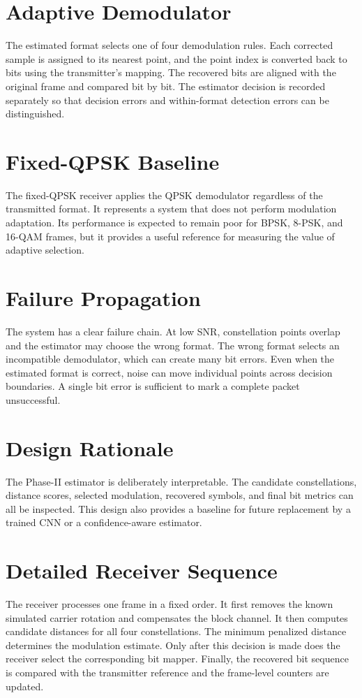 \documentclass[12pt,twoside,openright]{report}
\begin{document}
\section{Adaptive Demodulator}
The estimated format selects one of four demodulation rules. Each corrected
sample is assigned to its nearest point, and the point index is converted
back to bits using the transmitter's mapping. The recovered bits are aligned
with the original frame and compared bit by bit. The estimator decision is
recorded separately so that decision errors and within-format detection
errors can be distinguished.

\section{Fixed-QPSK Baseline}
The fixed-QPSK receiver applies the QPSK demodulator regardless of the
transmitted format. It represents a system that does not perform modulation
adaptation. Its performance is expected to remain poor for BPSK, 8-PSK, and
16-QAM frames, but it provides a useful reference for measuring the value of
adaptive selection.

\section{Failure Propagation}
The system has a clear failure chain. At low SNR, constellation points
overlap and the estimator may choose the wrong format. The wrong format
selects an incompatible demodulator, which can create many bit errors.
Even when the estimated format is correct, noise can move individual points
across decision boundaries. A single bit error is sufficient to mark a
complete packet unsuccessful.

\section{Design Rationale}
The Phase-II estimator is deliberately interpretable. The candidate
constellations, distance scores, selected modulation, recovered symbols, and
final bit metrics can all be inspected. This design also provides a baseline
for future replacement by a trained CNN or a confidence-aware estimator.

\section{Detailed Receiver Sequence}
The receiver processes one frame in a fixed order. It first removes the
known simulated carrier rotation and compensates the block channel. It then
computes candidate distances for all four constellations. The minimum
penalized distance determines the modulation estimate. Only after this
decision is made does the receiver select the corresponding bit mapper.
Finally, the recovered bit sequence is compared with the transmitter
reference and the frame-level counters are updated.
\end{document}
